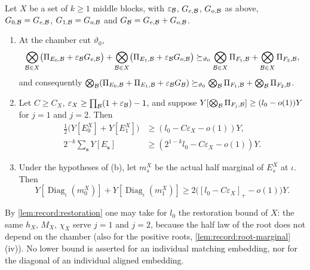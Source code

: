 \begin{lemma}\label{lem:record:paired-e-joint}
Let $X$ be a set of $k\ge1$ middle blocks, with $\varepsilon_\mathcal B$, $G_{e,\mathcal B}$,
$G_{o,\mathcal B}$ as above, $G_{0,\mathcal B}=G_{e,\mathcal B}$, $G_{1,\mathcal B}=G_{o,\mathcal B}$ and
$G_\mathcal B=G_{e,\mathcal B}+G_{o,\mathcal B}$.
\begin{enumerate}[label=(\alph*)]
\item At the chamber cut $\vartheta_0$,
 \[
  \bigotimes_{\mathcal B\in X}\bigl(\Pi_{E_0,\mathcal B}+\varepsilon_\mathcal B G_{e,\mathcal B}\bigr)
  +\bigotimes_{\mathcal B\in X}\bigl(\Pi_{E_1,\mathcal B}+\varepsilon_\mathcal B G_{o,\mathcal B}\bigr)
  \succeq_{\vartheta_0}\bigotimes_{\mathcal B\in X}\Pi_{F_1,\mathcal B}
  +\bigotimes_{\mathcal B\in X}\Pi_{F_2,\mathcal B},
 \]
 and consequently
 $\bigotimes_\mathcal B(\Pi_{E_0,\mathcal B}+\Pi_{E_1,\mathcal B}+\varepsilon_\mathcal B G_\mathcal B)
 \succeq_{\vartheta_0}\bigotimes_\mathcal B\Pi_{F_1,\mathcal B}+\bigotimes_\mathcal B\Pi_{F_2,\mathcal B}$.
\item Let $C\ge C_X$, $\varepsilon_X\ge\prod_\mathcal B(1+\varepsilon_\mathcal B)-1$, and
 suppose $Y[\bigotimes_\mathcal B\Pi_{F_j,\mathcal B}]\ge(l_0-o(1))Y$ for $j=1$ and $j=2$.
 Then
 \begin{align*}
  \tfrac12\bigl(Y[E^X_0]+Y[E^X_1]\bigr)&\ge(l_0-C\varepsilon_X-o(1))Y,\\
  2^{-k}\textstyle\sum_{\mathbf s}Y[E_{\mathbf s}]
  &\ge(2^{1-k}l_0-C\varepsilon_X-o(1))Y.
 \end{align*}
\item Under the hypotheses of (b), let $m^X_s$ be the actual half marginal of
 $E^X_s$ at $\iota$. Then
 \[
  Y[\operatorname{Diag}_\iota(m^X_0)]+Y[\operatorname{Diag}_\iota(m^X_1)]
  \ge2\bigl([l_0-C\varepsilon_X]_+-o(1)\bigr)Y .
 \]
\end{enumerate}
By \cref{lem:record:restoration} one may take for $l_0$ the restoration bound
of $X$: the same $h_X$, $M_X$, $\chi_X$ serve $j=1$ and $j=2$, because the
half law of the root does not depend on the chamber (also for the positive
roots, \cref{lem:record:root-marginal}(iv)). No lower bound is asserted for an
individual matching embedding, nor for the diagonal of an individual aligned
embedding.
\end{lemma}

